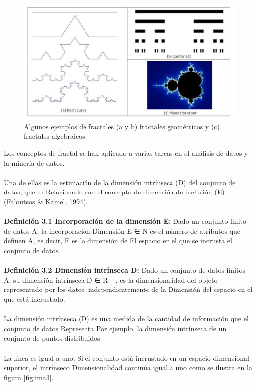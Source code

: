 \begin{figure}[h]
\centering
\includegraphics[scale=1.2]{chapter4/ima2.png}
\caption{Algunos ejemplos de fractales (a y b) fractales geométricos y (c) fractales algebraicos}
\label{fig:ima2}
\end{figure}


Los conceptos de fractal se han aplicado a varias tareas en el análisis de datos y la minería de datos.
\\\\
Una de ellas es la estimación de la dimensión intrínseca (D) del conjunto de datos, que es
Relacionado con el concepto de dimensión de inclusión (E) (Faloutsos & Kamel, 1994).
\\\\
\textbf{Definición 3.1 Incorporación de la dimensión E:} Dado un conjunto finito de datos A, la incorporación
Dimensión E ∈ N es el número de atributos que definen A, es decir, E es la dimensión de
El espacio en el que se incrusta el conjunto de datos.
\\\\
\textbf{Definición 3.2 Dimensión intrínseca D:} Dado un conjunto de datos finitos A, su dimensión intrínseca
D ∈ R +, es la dimensionalidad del objeto representado por los datos, independientemente de la
Dimensión del espacio en el que está incrustado.
\\\\
La dimensión intrínseca (D) es una medida de la cantidad de información que el conjunto de datos
Representa Por ejemplo, la dimensión intrínseca de un conjunto de puntos distribuidos
\\\\
La línea es igual a uno; Si el conjunto está incrustado en un espacio dimensional superior, el intrínseco
Dimensionalidad continúa igual a uno como se ilustra en la figura \ref{fig:ima3}.


